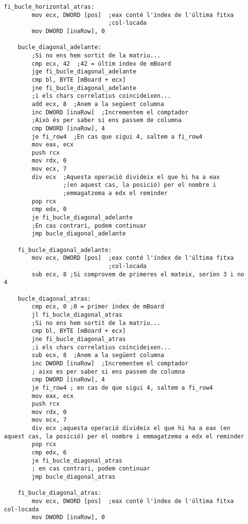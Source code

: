 \documentclass[a4paper,12pt]{article}
\begin{document}
\begin{lstlisting}[firstnumber=524]
    fi_bucle_horizontal_atras:
        mov ecx, DWORD [pos]  ;eax conté l'índex de l'última fitxa
							  ;col·locada
        mov DWORD [inaRow], 0
         
    bucle_diagonal_adelante:
		;Si no ens hem sortit de la matriu...
		cmp ecx, 42  ;42 = últim índex de mBoard
        jge fi_bucle_diagonal_adelante
		cmp bl, BYTE [mBoard + ecx]
        jne fi_bucle_diagonal_adelante
        ;i els chars correlatius coincideixen...
        add ecx, 8  ;Anem a la següent columna
        inc DWORD [inaRow]  ;Incrementem el comptador
        ;Això és per saber si ens passem de columna
        cmp DWORD [inaRow], 4
        je fi_row4  ;En cas que sigui 4, saltem a fi_row4
        mov eax, ecx
        push rcx
        mov rdx, 0
        mov ecx, 7
        div ecx  ;Aquesta operació divideix el que hi ha a eax
				 ;(en aquest cas, la posició) per el nombre i
				 ;emmagatzema a edx el reminder
        pop rcx
        cmp edx, 0
        je fi_bucle_diagonal_adelante
        ;En cas contrari, podem continuar
        jmp bucle_diagonal_adelante

    fi_bucle_diagonal_adelante:
        mov ecx, DWORD [pos]  ;eax conté l'índex de l'última fitxa
							  ;col·locada
        sub ecx, 8 ;Si comprovem de primeres el mateix, seríen 3 i no 4

    bucle_diagonal_atras:
        cmp ecx, 0 ;0 = primer índex de mBoard
        jl fi_bucle_diagonal_atras
        ;Si no ens hem sortit de la matriu...
        cmp bl, BYTE [mBoard + ecx]
        jne fi_bucle_diagonal_atras
        ;i els chars correlatius coincideixen...
        sub ecx, 8  ;Anem a la següent columna
        inc DWORD [inaRow]  ;Incrementem el comptador
        ; aixo es per saber si ens passem de columna
        cmp DWORD [inaRow], 4
        je fi_row4 ; en cas de que sigui 4, saltem a fi_row4
        mov eax, ecx
        push rcx
        mov rdx, 0
        mov ecx, 7
        div ecx ;aquesta operació divideix el que hi ha a eax (en aquest cas, la posició) per el nombre i emmagatzema a edx el reminder
        pop rcx
        cmp edx, 6
        je fi_bucle_diagonal_atras
        ; en cas contrari, podem continuar
        jmp bucle_diagonal_atras

    fi_bucle_diagonal_atras:
        mov ecx, DWORD [pos]  ;eax conté l'índex de l'última fitxa col·locada
        mov DWORD [inaRow], 0
        

\end{lstlisting}
\end{document}
